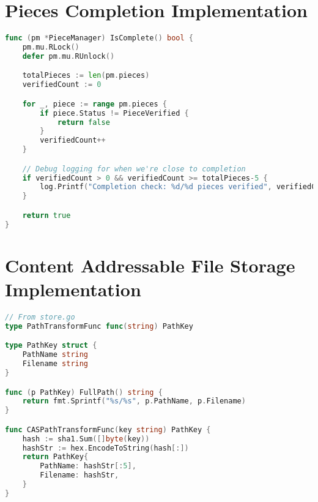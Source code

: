 \documentclass[12pt,a4paper]{report}
\begin{document}
\section{Pieces Completion Implementation}
\begin{lstlisting}[language=Go, caption={Pieces Completion Code}, label={lst:piece-completion}]
func (pm *PieceManager) IsComplete() bool {
	pm.mu.RLock()
	defer pm.mu.RUnlock()

	totalPieces := len(pm.pieces)
	verifiedCount := 0

	for _, piece := range pm.pieces {
		if piece.Status != PieceVerified {
			return false
		}
		verifiedCount++
	}

	// Debug logging for when we're close to completion
	if verifiedCount > 0 && verifiedCount >= totalPieces-5 {
		log.Printf("Completion check: %d/%d pieces verified", verifiedCount, totalPieces)
	}

	return true
}
\end{lstlisting}

\section{Content Addressable File Storage Implementation}
\begin{lstlisting}[language=Go, caption={Content Addressable File/Chunk Code}, label={lst:cas-storage}]
  // From store.go
type PathTransformFunc func(string) PathKey

type PathKey struct {
    PathName string
    Filename string
}

func (p PathKey) FullPath() string {
    return fmt.Sprintf("%s/%s", p.PathName, p.Filename)
}

func CASPathTransformFunc(key string) PathKey {
    hash := sha1.Sum([]byte(key))
    hashStr := hex.EncodeToString(hash[:])
    return PathKey{
        PathName: hashStr[:5],
        Filename: hashStr,
    }
}
\end{lstlisting}
\end{document}

